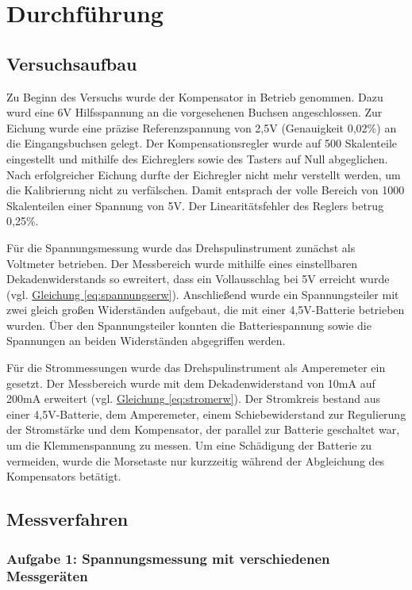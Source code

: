 \chapter{Durchführung}

\section{Versuchsaufbau}
Zu Beginn des Versuchs wurde der Kompensator in Betrieb genommen. Dazu wurd eine 6V Hilfsspannung an die vorgesehenen Buchsen angeschlossen. Zur Eichung wurde eine präzise Referenzspannung von 2,5V (Genauigkeit 0,02\%) an die Eingangsbuchsen gelegt. Der Kompensationsregler wurde auf 500 Skalenteile eingestellt und mithilfe des Eichreglers sowie des Tasters auf Null abgeglichen. Nach erfolgreicher Eichung durfte der Eichregler nicht mehr verstellt werden, um die Kalibrierung nicht zu verfälschen. Damit entsprach der volle Bereich von 1000 Skalenteilen einer Spannung von 5V. Der Linearitätsfehler des Reglers betrug 0,25\%.

Für die Spannungsmessung wurde das Drehspulinstrument zunächst als Voltmeter betrieben. Der Messbereich wurde mithilfe eines einstellbaren Dekadenwiderstands so ewreitert, dass ein Vollausschlag bei 5V erreicht wurde (vgl. \hyperref[eq:spannungserw]{Gleichung \ref*{eq:spannungserw}}). Anschließend wurde ein Spannungsteiler mit zwei gleich großen Widerständen aufgebaut, die mit einer 4,5V-Batterie betrieben wurden. Über den Spannungsteiler konnten die Batteriespannung sowie die Spannungen an beiden Widerständen abgegriffen werden.

Für die Strommessungen wurde das Drehspulinstrument als Amperemeter ein gesetzt. Der Messbereich wurde mit dem Dekadenwiderstand von 10mA auf 200mA erweitert (vgl. \hyperref[eq:stromerw]{Gleichung \ref*{eq:stromerw}}). Der Stromkreis bestand aus einer 4,5V-Batterie, dem Amperemeter, einem Schiebewiderstand zur Regulierung der Stromstärke und dem Kompensator, der parallel zur Batterie geschaltet war, um die Klemmenspannung zu messen. Um eine Schädigung der Batterie zu vermeiden, wurde die Morsetaste nur kurzzeitig während der Abgleichung des Kompensators betätigt.

\section{Messverfahren}

\subsection*{Aufgabe 1: Spannungsmessung mit verschiedenen Messgeräten}

